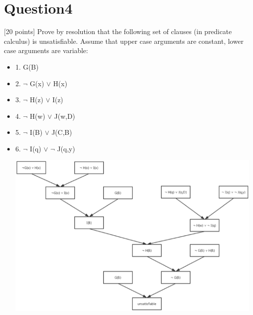 \documentclass{article}
\begin{document}
\section{Question4}
[20 points] Prove by resolution that the following set of clauses (in predicate calculus) is unsatisfiable. Assume that upper case arguments are constant, lower case arguments are variable:
\begin{itemize}
    
\item 1.    G(B)
\item 2.    $\neg$ G(x) $\vee$ H(x)
\item 3.    $\neg$ H(z) $\vee$ I(z)
\item 4.    $\neg$ H(w) $\vee$ J(w,D)
\item 5.    $\neg$ I(B) $\vee$ J(C,B)
\item 6.    $\neg$ I(q) $\vee$ $\neg$ J(q,y)
\begin{center}
    \includegraphics[scale=0.4]{pic}
\end{center}
\end{itemize}
\end{document}
